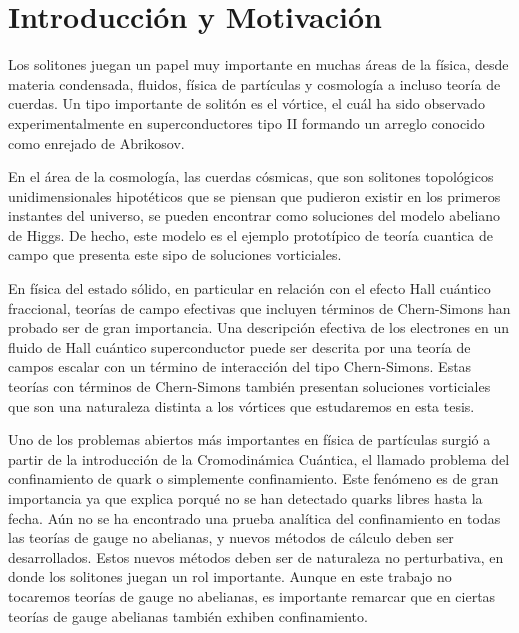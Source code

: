 
\chapter{Introducción y Motivación} %

\label{ch:intro} %

Los solitones juegan un papel muy importante en muchas áreas de la física, desde materia condensada, fluidos, física de partículas y cosmología a incluso teoría de cuerdas. Un tipo importante de solitón es el vórtice, el cuál ha sido observado experimentalmente en superconductores tipo II formando un arreglo conocido como enrejado de Abrikosov.

En el área de la cosmología, las cuerdas cósmicas, que son solitones topológicos unidimensionales hipotéticos que se piensan que pudieron existir en los primeros instantes del universo, se pueden encontrar como soluciones del modelo abeliano de Higgs. De hecho, este modelo es el ejemplo prototípico de teoría cuantica de campo que presenta este sipo de soluciones vorticiales.

En física del estado sólido, en particular en relación con el efecto Hall cuántico fraccional, teorías de campo efectivas que incluyen términos de Chern-Simons han probado ser de gran importancia. Una descripción efectiva de los electrones en un fluido de Hall cuántico superconductor puede ser descrita por una teoría de campos escalar con un término de interacción del tipo Chern-Simons. Estas teorías con términos de Chern-Simons también presentan soluciones vorticiales que son una naturaleza distinta a los vórtices que estudaremos en esta tesis.

Uno de los problemas abiertos más importantes en física de partículas surgió a partir de la introducción de la Cromodinámica Cuántica, el llamado problema del confinamiento de quark o simplemente confinamiento. Este fenómeno es de gran importancia ya que explica porqué no se han detectado quarks libres hasta la fecha. Aún no se ha encontrado una prueba analítica del confinamiento en todas las teorías de gauge no abelianas, y nuevos métodos de cálculo deben ser desarrollados. Estos nuevos métodos deben ser de naturaleza no perturbativa, en donde los solitones juegan un rol importante. Aunque en este trabajo no tocaremos teorías de gauge no abelianas, es importante remarcar que en ciertas teorías de gauge abelianas también exhiben confinamiento.

